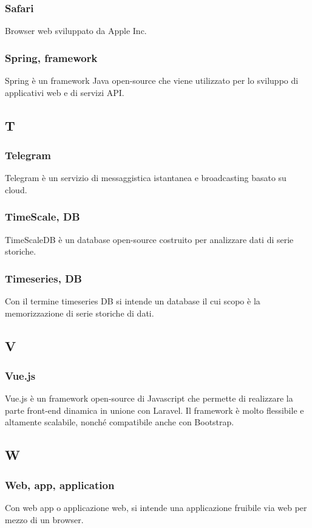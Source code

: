 \subsubsection*{Safari}
Browser web sviluppato da Apple Inc.
\subsubsection*{Spring, framework}  Spring è un framework Java open-source che viene utilizzato per lo sviluppo di applicativi web e di servizi API.
\subsection{T}
\subsubsection*{Telegram}  Telegram è un servizio di messaggistica istantanea e broadcasting basato su cloud.
\subsubsection*{TimeScale, DB}  TimeScaleDB è un database open-source costruito per analizzare dati di serie storiche.
\subsubsection*{Timeseries, DB}  Con il termine timeseries DB si intende un database il cui scopo è la memorizzazione di serie storiche di dati.
\subsection{V}
\subsubsection*{Vue.js}  Vue.js è un framework open-source di Javascript che permette di realizzare la parte front-end dinamica in unione con Laravel. Il framework è molto flessibile e altamente scalabile, nonché compatibile anche con Bootstrap.
\subsection{W}
\subsubsection*{Web, app, application}
Con web app o applicazione web, si intende una applicazione fruibile via web per mezzo di un browser.